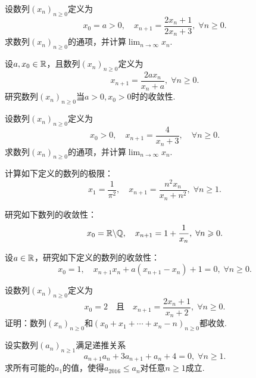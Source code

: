 \begin{problem}
  设数列$(x_n)_{n\ge0}$定义为
  \[
    x_0 = a > 0,\quad x_{n+1} = \frac{2x_n+1}{2x_n+3},\; \forall n\ge0.
  \]
  求数列$(x_n)_{n\ge0}$的通项，并计算$\lim_{n\to\infty}x_n$.
\end{problem}

\begin{problem}
  设$a,x_0\in\mathbb R$，且数列$(x_n)_{n\ge0}$定义为
  \[
    x_{n+1} = \frac{2ax_n}{x_n+a},\; \forall n\ge0.
  \]
  研究数列$(x_n)_{n\ge0}$当$a>0,x_0>0$时的收敛性.
\end{problem}

\begin{problem}
  设数列$(x_n)_{n\ge0}$定义为
  \[
    x_0 > 0,\quad x_{n+1} = \frac4{x_n + 3},\quad  \forall n\ge0.
  \]
  求数列$(x_n)_{n\ge0}$的通项，并计算$\lim_{n\to\infty}x_n$.
\end{problem}

\begin{problem}
  计算如下定义的数列的极限：
  \[
    x_1 = \frac1{\pi^2},\quad  x_{n+1} = \frac{n^2x_n}{x_n+n^2},\; \forall n\ge1.
  \]
\end{problem}

\begin{problem}
  研究如下数列的收敛性：
  \[
    x_0 = \mathbb R\backslash\mathbb Q,\quad x_{n+1} = 1 + \frac1{x_n},\; \forall n\geqslant0.
  \]
\end{problem}

\begin{problem}
  设$a\in\mathbb R$，研究如下定义的数列的收敛性：
  \[
    x_0 = 1,\quad x_{n+1}x_n + a(x_{n+1} - x_n) + 1 = 0,\; \forall n\ge0.
  \]
\end{problem}

\begin{problem}
  设数列$(x_n)_{n\ge0}$定义为
  \[
    x_0 = 2 \quad \text{且} \quad
    x_{n+1} = \frac{2x_n + 1}{x_n + 2},\; \forall n\ge0.
  \]
  证明：数列$(x_n)_{n\ge0}$和$(x_0+x_1+\cdots+x_n-n)_{n\ge0}$都收敛.
\end{problem}

\begin{problem}
  设实数列$(a_n)_{n\ge1}$满足递推关系
  \[
    a_{n+1}a_n + 3a_{n+1} + a_n + 4 = 0,\; \forall n\ge1.
  \]
  求所有可能的$a_1$的值，使得$a_{2016}\le a_n$对任意$n\ge1$成立.
\end{problem}

